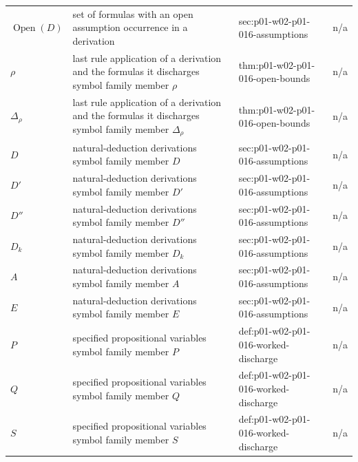 \begin{longtable}{@{}p{}p{}p{}p{}@{}}
\(\operatorname{Open}(D)\) & set of formulas with an open assumption occurrence in a derivation & sec:\allowbreak{}p01-\allowbreak{}w02-\allowbreak{}p01-\allowbreak{}016-\allowbreak{}assumptions & n/a \\
\(\rho\) & last rule application of a derivation and the formulas it discharges symbol family member \(\rho\) & thm:\allowbreak{}p01-\allowbreak{}w02-\allowbreak{}p01-\allowbreak{}016-\allowbreak{}open-\allowbreak{}bounds & n/a \\
\(\Delta_\rho\) & last rule application of a derivation and the formulas it discharges symbol family member \(\Delta_\rho\) & thm:\allowbreak{}p01-\allowbreak{}w02-\allowbreak{}p01-\allowbreak{}016-\allowbreak{}open-\allowbreak{}bounds & n/a \\
\(D\) & natural-deduction derivations symbol family member \(D\) & sec:\allowbreak{}p01-\allowbreak{}w02-\allowbreak{}p01-\allowbreak{}016-\allowbreak{}assumptions & n/a \\
\(D'\) & natural-deduction derivations symbol family member \(D'\) & sec:\allowbreak{}p01-\allowbreak{}w02-\allowbreak{}p01-\allowbreak{}016-\allowbreak{}assumptions & n/a \\
\(D''\) & natural-deduction derivations symbol family member \(D''\) & sec:\allowbreak{}p01-\allowbreak{}w02-\allowbreak{}p01-\allowbreak{}016-\allowbreak{}assumptions & n/a \\
\(D_k\) & natural-deduction derivations symbol family member \(D_k\) & sec:\allowbreak{}p01-\allowbreak{}w02-\allowbreak{}p01-\allowbreak{}016-\allowbreak{}assumptions & n/a \\
\(A\) & natural-deduction derivations symbol family member \(A\) & sec:\allowbreak{}p01-\allowbreak{}w02-\allowbreak{}p01-\allowbreak{}016-\allowbreak{}assumptions & n/a \\
\(E\) & natural-deduction derivations symbol family member \(E\) & sec:\allowbreak{}p01-\allowbreak{}w02-\allowbreak{}p01-\allowbreak{}016-\allowbreak{}assumptions & n/a \\
\(P\) & specified propositional variables symbol family member \(P\) & def:\allowbreak{}p01-\allowbreak{}w02-\allowbreak{}p01-\allowbreak{}016-\allowbreak{}worked-\allowbreak{}discharge & n/a \\
\(Q\) & specified propositional variables symbol family member \(Q\) & def:\allowbreak{}p01-\allowbreak{}w02-\allowbreak{}p01-\allowbreak{}016-\allowbreak{}worked-\allowbreak{}discharge & n/a \\
\(S\) & specified propositional variables symbol family member \(S\) & def:\allowbreak{}p01-\allowbreak{}w02-\allowbreak{}p01-\allowbreak{}016-\allowbreak{}worked-\allowbreak{}discharge & n/a \\

\end{longtable}
